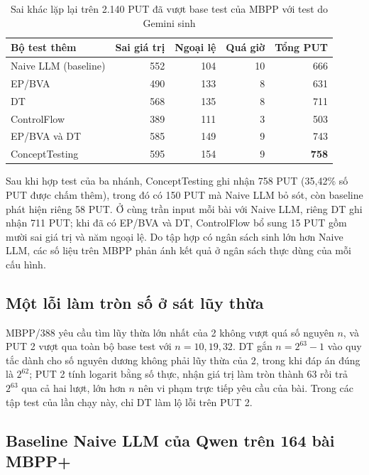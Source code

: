 \begin{table}[!htbp]
\centering
\caption{Sai khác lặp lại trên 2.140 PUT đã vượt base test của MBPP với test do Gemini sinh}
\label{tab:mbpp-detections}
\small
\begin{tabular*}{\linewidth}{@{\extracolsep{\fill}}lrrrr@{}}
\toprule
Bộ test thêm & Sai giá trị & Ngoại lệ & Quá giờ & Tổng PUT \\
\midrule
Naive LLM (baseline) & 552 & 104 & 10 & 666 \\
\midrule
EP/BVA & 490 & 133 & 8 & 631 \\
DT & 568 & 135 & 8 & 711 \\
ControlFlow & 389 & 111 & 3 & 503 \\
EP/BVA và DT & 585 & 149 & 9 & 743 \\
ConceptTesting & 595 & 154 & 9 & \textbf{758} \\
\bottomrule
\end{tabular*}
\end{table}

Sau khi hợp test của ba nhánh, ConceptTesting ghi nhận 758 PUT (35,42\% số PUT được chấm thêm), trong đó có 150 PUT mà Naive LLM bỏ sót, còn baseline phát hiện riêng 58 PUT. Ở cùng trần input mỗi bài với Naive LLM, riêng DT ghi nhận 711 PUT; khi đã có EP/BVA và DT, ControlFlow bổ sung 15 PUT gồm mười sai giá trị và năm ngoại lệ. Do tập hợp có ngân sách sinh lớn hơn Naive LLM, các số liệu trên MBPP phản ánh kết quả ở ngân sách thực dùng của mỗi cấu hình.

\subsection{Một lỗi làm tròn số ở sát lũy thừa}
\label{sec:mbpp-rounding}

MBPP/388 yêu cầu tìm lũy thừa lớn nhất của 2 không vượt quá số nguyên \(n\), và PUT 2 vượt qua toàn bộ base test với \(n=10,19,32\). DT gắn \(n=2^{63}-1\) vào quy tắc dành cho số nguyên dương không phải lũy thừa của 2, trong khi đáp án đúng là \(2^{62}\); PUT 2 tính logarit bằng số thực, nhận giá trị làm tròn thành 63 rồi trả \(2^{63}\) qua cả hai lượt, lớn hơn \(n\) nên vi phạm trực tiếp yêu cầu của bài. Trong các tập test của lần chạy này, chỉ DT làm lộ lỗi trên PUT 2.

\subsection{Baseline Naive LLM của Qwen trên 164 bài MBPP+}
\label{sec:mbpp-qwen-plain}

